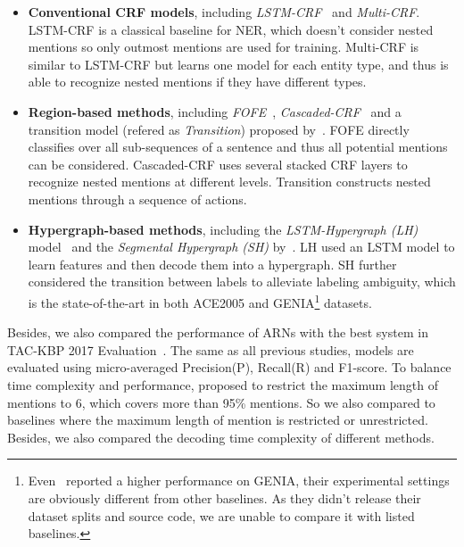 \documentclass[11pt,a4paper]{article}
\begin{document}
\begin{itemize}[leftmargin=0.3cm,topsep=0.0cm]
\setlength{\itemsep}{0pt}
\setlength{\parskip}{2pt}
\item \textbf{Conventional CRF models}, including \emph{LSTM-CRF}~\cite{lample2016neural} and \emph{Multi-CRF}. LSTM-CRF is a classical baseline for NER, which doesn't consider nested mentions so only outmost mentions are used for training. Multi-CRF is similar to LSTM-CRF but learns one model for each entity type, and thus is able to recognize nested mentions if they have different types.

\item \textbf{Region-based methods}, including \emph{FOFE}~\cite{P17-1114}, \emph{Cascaded-CRF}~\cite{N18-1131} and a transition model (refered as \emph{Transition}) proposed by~\citet{D18-1124}. FOFE directly classifies over all sub-sequences of a sentence and thus all potential mentions can be considered. Cascaded-CRF uses several stacked CRF layers to recognize nested mentions at different levels. Transition constructs nested mentions through a sequence of actions.

\item \textbf{Hypergraph-based methods}, including the \emph{LSTM-Hypergraph (LH)} model~\cite{N18-1079} and the \emph{Segmental Hypergraph (SH)} by~\citet{D18-1019}. LH used an LSTM model to learn features and then decode them into a hypergraph. SH further considered the transition between labels to alleviate labeling ambiguity, which is the state-of-the-art in both ACE2005 and GENIA\footnote{Even~\citet{D18-1309} reported a higher performance on GENIA, their experimental settings are obviously different from other baselines. As they didn't release their dataset splits and source code, we are unable to compare it with listed baselines.} datasets.

\end{itemize}

Besides, we also compared the performance of ARNs with the best system in TAC-KBP 2017 Evaluation~\cite{ji2017overview}. The same as all previous studies, models are evaluated using micro-averaged Precision(P), Recall(R) and F1-score. To balance time complexity and performance, \citet{D18-1019} proposed to restrict the maximum length of mentions to 6, which covers more than 95\% mentions. So we also compared to baselines where the maximum length of mention is restricted or unrestricted. Besides, we also compared the decoding time complexity of different methods.
\end{document}
